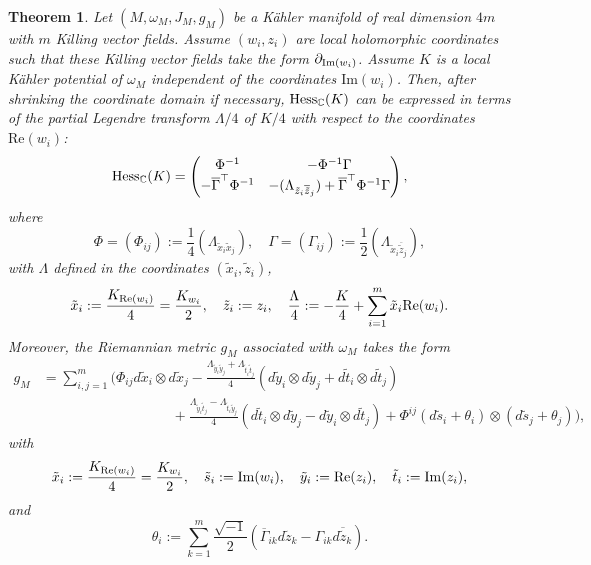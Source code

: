\documentclass[11pt,reqno]{amsart}
\newcommand{\C}{\mathbb{C}}
\theoremstyle{plain}
\newtheorem{theorem}{Theorem}[section]
\theoremstyle{definition}
\numberwithin{equation}{section}
\begin{document}
\begin{theorem}\label{CH}
Let $(M,\omega_M,J_M,g_M)$ be a Kähler manifold of real dimension $4m$ with $m$ Killing vector fields. Assume $(w_{i},z_{i})$ are local holomorphic coordinates such that these Killing vector fields take the form $\partial_{{\rm Im}(w_i)}$. Assume $K$ is a local Kähler potential of $\omega_M$ independent of the coordinates $\mathrm{Im}(w_{i})$. Then, after shrinking the coordinate domain if necessary, ${\rm Hess}_{\C}(K)$ can be expressed in terms of the partial Legendre transform $\Lambda/4$ of $K/4$ with respect to the coordinates $\mathrm{Re}(w_{i})$\textup{:}
\begin{align}{\rm Hess}_{\C}(K)=\begin{pmatrix}
   \Phi^{-1}  & -\Phi^{-1}\Gamma   \\
   - \overline{\Gamma}^{\top}\Phi^{-1}  & -(\Lambda_{\tilde{z}_{i}\overline{\tilde{z}}_{j}}) +\overline{\Gamma}^{\top} \Phi^{-1} \Gamma
\end{pmatrix},\label{eq:cx:hessian:leg}\end{align}
where
$$\Phi=(\Phi_{ij}):=\frac{1}{4}(\Lambda_{\tilde{x}_{i}\tilde{x}_{j}}) ,\quad  \Gamma=(\Gamma_{ij}):=\frac{1}{2}(\Lambda_{\tilde{x}_{i}\overline{\tilde{z}}_{j}}),$$
with $\Lambda$ defined in the coordinates $(\tilde{x}_{i},\tilde{z}_{i})$,
$$\tilde{x}_{i}:= \frac{K_{{\rm Re}(w_i)}}{4} = \frac{K_{w_{i}}}{2},\quad  \tilde{z}_{i}:=z_{i},\quad  
    \frac{\Lambda}{4}:=-\frac{K}{4}+ \sum_{i=1}^{m} \tilde{x}_{i}{\rm Re}(w_i).
$$
Moreover, the Riemannian metric $g_M$ associated with $\omega_M$ takes the form
\begin{align*}
g_M & = \sum_{i,j=1}^m \biggl(\Phi_{ij} d\tilde{x}_{i}\otimes d\tilde{x}_{j}-\displaystyle \frac{\Lambda_{\tilde{y}_{i}\tilde{y}_{j}}+\Lambda_{\tilde{t}_{i}\tilde{t}_{j}}}{4}(d\tilde{y}_{i}\otimes d\tilde{y}_{j} + d\tilde{t}_{i} \otimes d\tilde{t}_{j})  \\
     &  \; \quad  \quad  \quad  \quad  \quad  \quad \quad \quad \, \, \, \, \, \,  +\displaystyle
    \frac{\Lambda_{\tilde{y}_{i}\tilde{t}_{j}}-\Lambda_{\tilde{t}_{i}\tilde{y}_{j}}}{4}(d\tilde{t}_{i}\otimes d\tilde{y}_{j}-d\tilde{y}_{i}\otimes d\tilde{t}_{j})+\Phi^{ij}(d\tilde{s}_{i}+\theta_{i})\otimes(d\tilde{s}_{j}+\theta_{j})\biggr), \nonumber
\end{align*}
with
$$\tilde{x}_{i}:= \frac{K_{{\rm Re}(w_i)}}{4} =\frac{K_{w_{i}}}{2},\quad   \tilde{s}_{i}:=\mathrm{Im}(w_{i})  ,\quad  \tilde{y}_{i}:=\mathrm{Re}(z_{i}) ,\quad  \tilde{t}_{i}:=\mathrm{Im}(z_{i}),$$
and
$$\theta_{i}:=\sum_{k=1}^{m}\frac{ \sqrt{-1}}{2}( \overline{\Gamma}_{ik}d\tilde{z}_{k}-\Gamma_{ik}d\overline{\tilde{z}}_{k}).$$
\end{theorem} 
\end{document}
